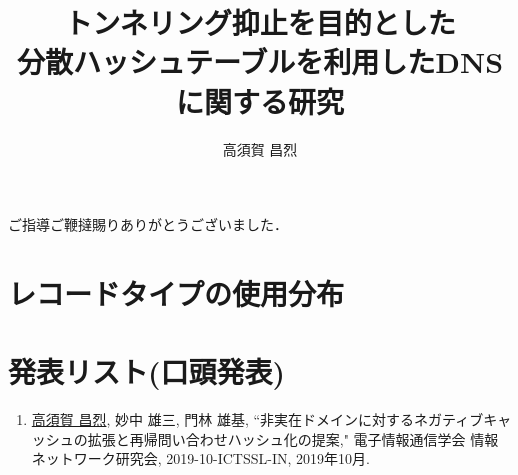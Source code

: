 \documentclass[12pt]{jarticle} %
\title{トンネリング抑止を目的とした\\分散ハッシュテーブルを利用したDNSに関する研究}
\author{高須賀 昌烈}
\begin{document}
\titlepage
\cmemberspage
\firstabstract
\secondabstract



\toc
\newpage
\listoffigures
\newpage
\listoftables
\listofalgorithms



\newpage
{}











\newpage
\acknowledgements
ご指導ご鞭撻賜りありがとうございました．




\newpage




\appendix

\section{レコードタイプの使用分布}


\newpage
\section{発表リスト(口頭発表)}
\begin{enumerate}
 \item \underline{高須賀 昌烈}, 妙中 雄三, 門林 雄基, ``非実在ドメインに対するネガティブキャッシュの拡張と再帰問い合わせハッシュ化の提案," 電子情報通信学会 情報ネットワーク研究会, 2019-10-ICTSSL-IN, 2019年10月.
\end{enumerate}
\end{document}
